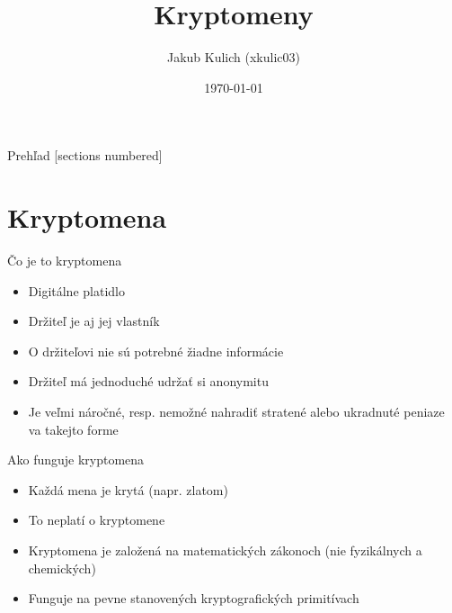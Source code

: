 \documentclass{beamer}
\title[Kryptomeny]{Kryptomeny}
\author{Jakub Kulich (xkulic03)}
\institute{Fakulta informačních technologií VUT v Brně}
\date{\today}
\begin{document}
\begin{frame}
\titlepage
\end{frame}

\begin{frame}{Prehľad}
    [sections numbered]
    \tableofcontents[hideallsubsections]
\end{frame}

\section{Kryptomena}

\begin{frame}{Čo je to kryptomena}
    \begin{itemize}
            \item Digitálne platidlo
            \item Držiteľ je aj jej vlastník
            \item O držiteľovi nie sú potrebné žiadne informácie 
            \item Držiteľ má jednoduché udržať si anonymitu
            \item Je veľmi náročné, resp. nemožné nahradiť stratené alebo ukradnuté peniaze va takejto forme
    \end{itemize}
\end{frame}

\begin{frame}{Ako funguje kryptomena}
    \begin{itemize}
        \item Každá mena je krytá (napr. zlatom)
        \item To neplatí o kryptomene
        \item Kryptomena je založená na matematických zákonoch (nie fyzikálnych a chemických)
        \item Funguje na pevne stanovených kryptografických primitívach
    \end{itemize}
\end{frame}
\end{document}
